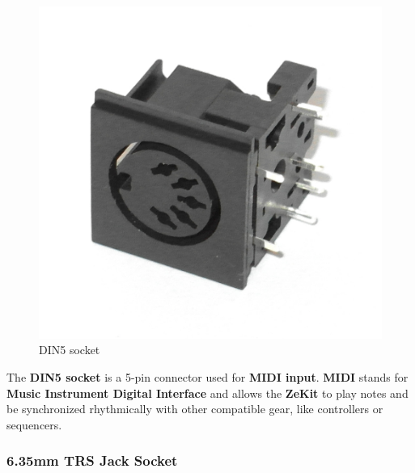 \documentclass{scrartcl}
\begin{document}
\begin{figure}[!ht]
    \begin{center}
        \includegraphics[scale=0.20]{assets/zekit-din.jpg}
        \caption{DIN5 socket}
    \end{center}
\end{figure}

The \textbf{DIN5 socket} is a 5-pin connector used for \textbf{MIDI input}. \textbf{MIDI} stands for \textbf{Music Instrument Digital Interface} and allows the \textbf{ZeKit} to play notes and be synchronized rhythmically with other compatible gear, like controllers or sequencers.

\subsubsection{6.35mm TRS Jack Socket}
\end{document}
